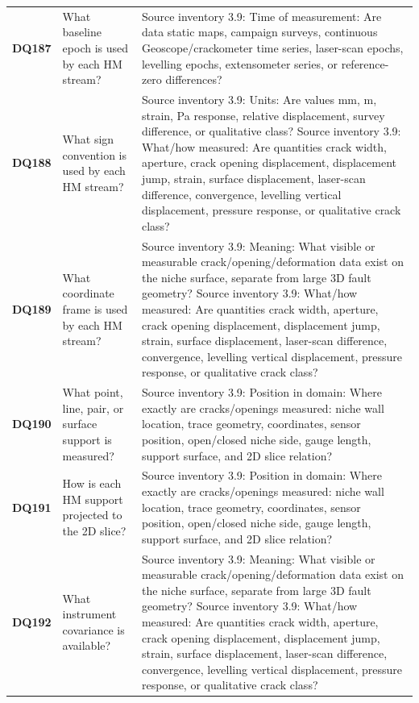 \begin{longtable}{@{}L{0.09\textwidth} L{0.31\textwidth} L{0.52\textwidth}@{}}
\addlinespace[0.18em]
\textbf{DQ187} & What baseline epoch is used by each HM stream? & Source inventory 3.9: Time of measurement: Are data static maps, campaign surveys, continuous Geoscope/crackometer time series, laser-scan epochs, levelling epochs, extensometer series, or reference-zero differences?\\
\addlinespace[0.18em]
\textbf{DQ188} & What sign convention is used by each HM stream? & Source inventory 3.9: Units: Are values mm, m, strain, Pa response, relative displacement, survey difference, or qualitative class? Source inventory 3.9: What/how measured: Are quantities crack width, aperture, crack opening displacement, displacement jump, strain, surface displacement, laser-scan difference, convergence, levelling vertical displacement, pressure response, or qualitative crack class?\\
\addlinespace[0.18em]
\textbf{DQ189} & What coordinate frame is used by each HM stream? & Source inventory 3.9: Meaning: What visible or measurable crack/opening/deformation data exist on the niche surface, separate from large 3D fault geometry? Source inventory 3.9: What/how measured: Are quantities crack width, aperture, crack opening displacement, displacement jump, strain, surface displacement, laser-scan difference, convergence, levelling vertical displacement, pressure response, or qualitative crack class?\\
\addlinespace[0.18em]
\textbf{DQ190} & What point, line, pair, or surface support is measured? & Source inventory 3.9: Position in domain: Where exactly are cracks/openings measured: niche wall location, trace geometry, coordinates, sensor position, open/closed niche side, gauge length, support surface, and 2D slice relation?\\
\addlinespace[0.18em]
\textbf{DQ191} & How is each HM support projected to the 2D slice? & Source inventory 3.9: Position in domain: Where exactly are cracks/openings measured: niche wall location, trace geometry, coordinates, sensor position, open/closed niche side, gauge length, support surface, and 2D slice relation?\\
\addlinespace[0.18em]
\textbf{DQ192} & What instrument covariance is available? & Source inventory 3.9: Meaning: What visible or measurable crack/opening/deformation data exist on the niche surface, separate from large 3D fault geometry? Source inventory 3.9: What/how measured: Are quantities crack width, aperture, crack opening displacement, displacement jump, strain, surface displacement, laser-scan difference, convergence, levelling vertical displacement, pressure response, or qualitative crack class?\\

\end{longtable}
